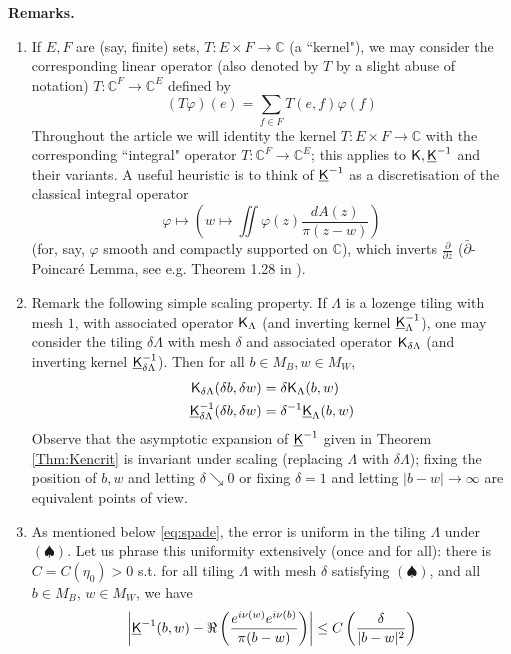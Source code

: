 \documentclass[10pt]{article}
\newcommand{\C}{\mathbb{C}}
\newcommand{\rK}{{\sf K}}
\newcommand{\uK}{{\underline {\sf K}}}
\newcommand{\dbar}{\bar\partial}
\begin{document}
{\bf Remarks.}\begin{enumerate}
\item
If $E,F$ are (say, finite) sets, $T:E\times F\rightarrow\C$ (a ``kernel"), we may consider the corresponding linear operator (also denoted by $T$ by a slight abuse of notation) $T:\C^F\rightarrow\C^E$ defined by
$$(T\varphi)(e)=\sum_{f\in F}T(e,f)\varphi(f)$$
Throughout the article we will identity the kernel $T:E\times F\rightarrow\C$ with the corresponding ``integral" operator $T:\C^F\rightarrow\C^E$; this applies to $\rK,\uK^{-1}$ and their variants. A useful heuristic is to think of $\uK^{-1}$ as a discretisation of the classical integral operator
$$\varphi\longmapsto\left(w\mapsto\iint\varphi(z)\frac{dA(z)}{\pi(z-w)}\right)$$
(for, say, $\varphi$ smooth and compactly supported on $\C$), which inverts $\frac{\partial}{\partial \bar z}$ ($\dbar$-Poincar\'e Lemma, see e.g. Theorem 1.28 in \cite{Voisin_Hodge}).

\item Remark the following simple scaling property. If $\Lambda$ is a lozenge tiling with mesh $1$, with associated operator $\rK_\Lambda$ (and inverting kernel $\uK_\Lambda^{-1}$), one may consider the tiling $\delta\Lambda$ with mesh $\delta$ and associated operator $\rK_{\delta\Lambda}$ (and inverting kernel $\uK^{-1}_{\delta\Lambda}$). Then for all $b\in M_B,w\in M_W$, 
\begin{align*}
\rK_{\delta\Lambda}(\delta b,\delta w)&=\delta\rK_{\Lambda}(b,w)\\
\uK^{-1}_{\delta\Lambda}(\delta b,\delta w)&=\delta^{-1}\uK_{\Lambda}(b,w)
\end{align*}
Observe that the asymptotic expansion of $\uK^{-1}$ given in Theorem \ref{Thm:Kencrit} is invariant under scaling (replacing $\Lambda$ with $\delta\Lambda$); fixing the position of $b,w$ and letting $\delta\searrow 0$ or fixing $\delta=1$ and letting $|b-w|\rightarrow\infty$ are equivalent points of view.

\item As mentioned below \eqref{eq:spade}, the error is uniform in the tiling $\Lambda$ under $(\spadesuit)$. Let us phrase this uniformity extensively (once and for all): there is $C=C(\eta_0)>0$ s.t. for all tiling $\Lambda$ with mesh $\delta$ satisfying $(\spadesuit)$, and all $b\in M_B$, $w\in M_W$, we have
$$\left|\uK^{-1}(b,w)-\Re\left(\frac{e^{i\nu(w)}e^{i\nu(b)}}{\pi(b-w)}\right)\right|\leq C\left(\frac{\delta}{|b-w|^{2}}\right)$$
\end{enumerate}
\end{document}
